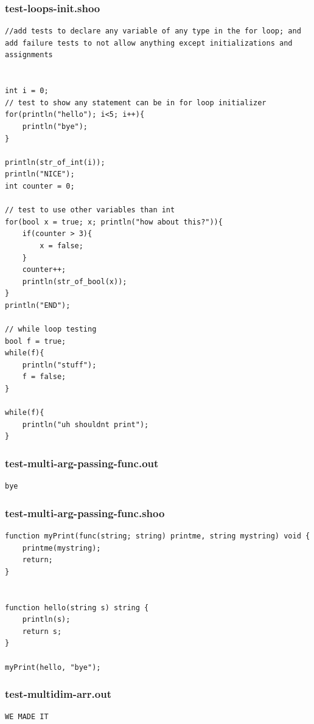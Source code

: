 \documentclass[12pt]{article}
\begin{document}
\subsubsection{test-loops-init.shoo}
\begin{mdframed}[hidealllines=true,backgroundcolor=blue!10]
\begin{lstlisting}
//add tests to declare any variable of any type in the for loop; and add failure tests to not allow anything except initializations and assignments


int i = 0;
// test to show any statement can be in for loop initializer
for(println("hello"); i<5; i++){
	println("bye");
}

println(str_of_int(i));
println("NICE");
int counter = 0;

// test to use other variables than int
for(bool x = true; x; println("how about this?")){
	if(counter > 3){
		x = false;
	}
	counter++;
	println(str_of_bool(x));
}
println("END");

// while loop testing
bool f = true;
while(f){
	println("stuff");
	f = false;
}

while(f){
	println("uh shouldnt print");
}\end{lstlisting}
\end{mdframed}
\subsubsection{test-multi-arg-passing-func.out}
\begin{mdframed}[hidealllines=true,backgroundcolor=green!10]
\begin{lstlisting}
bye
\end{lstlisting}
\end{mdframed}
\subsubsection{test-multi-arg-passing-func.shoo}
\begin{mdframed}[hidealllines=true,backgroundcolor=blue!10]
\begin{lstlisting}
function myPrint(func(string; string) printme, string mystring) void {
    printme(mystring);
    return;
}


function hello(string s) string {
    println(s);
    return s;
}

myPrint(hello, "bye");
\end{lstlisting}
\end{mdframed}
\subsubsection{test-multidim-arr.out}
\begin{mdframed}[hidealllines=true,backgroundcolor=green!10]
\begin{lstlisting}
WE MADE IT\end{lstlisting}
\end{mdframed}
\end{document}
